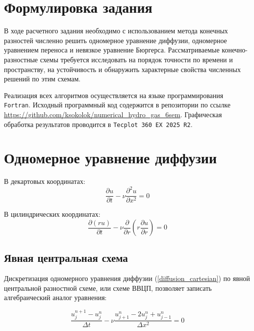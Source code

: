 \section{Формулировка задания}

В ходе расчетного задания необходимо с использованием метода конечных разностей численно решить одномерное уравнение диффузии, одномерное уравнением переноса и невязкое уравнение Бюргерса. 
Рассматриваемые конечно-разностные схемы требуется исследовать на порядок точности по времени и пространству, на устойчивость и обнаружить характерные свойства численных решений по этим схемам.

Реализация всех алгоритмов осуществляется на языке программирования \texttt{Fortran}. Исходный программный код содержится в репозитории по ссылке \url{https://github.com/ksokolok/numerical_hydro_gas_6sem}.
Графическая обработка результатов проводится в \texttt{Tecplot 360 EX 2025 R2}.

\section{Одномерное уравнение диффузии}


В декартовых координатах:
\begin{equation} \label{diffusion_cartesian}
\dfrac{\partial u}{\partial t} - \nu \dfrac{\partial^2 u}{\partial x^2} = 0
\end{equation}

В цилиндрических координатах:
\begin{equation} \label{diffusion_cilinder}
    \dfrac{\partial \left( ru \right)}{\partial t} - 
    \nu \dfrac{\partial}{\partial r} \left( r \dfrac{\partial u}{\partial r} \right) = 0
\end{equation}

\subsection{Явная центральная схема}

Дискретизация одномерного уравнения диффузии (\ref{diffusion_cartesian}) по явной центральной разностной схеме, или схеме ВВЦП, позволяет записать алгебраический аналог уравнения:

\begin{equation} \label{ftcs_given}
	\dfrac{u_j^{n+1} - u_j^n}{\Delta t} - \nu \dfrac{u_{j+1}^n - 2u_j^n + u_{j-1}^n}{\Delta x^2} = 0 %
\end{equation}

